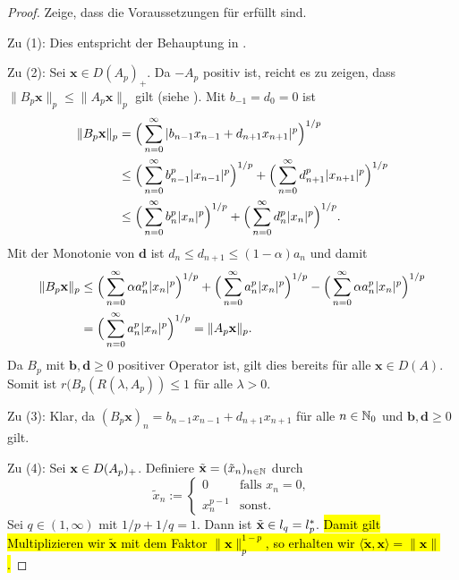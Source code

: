 \begin{proof}
\par
Zeige, dass die Voraussetzungen für  erfüllt sind.

\par
Zu (1): Dies entspricht der Behauptung in .

\par
Zu (2): Sei $\textbf{x}\in D(A_p)_+$. Da $-A_p$ positiv ist, reicht es zu zeigen, dass  $\|B_p\textbf{x}\|_p\leq\|A_p\textbf{x}\|_p$ gilt (siehe  ). Mit $b_{-1}=d_0=0$ ist
\begin{align*}
\|B_p\textnormal{\textbf{x}}\|_p
&= \Big(\sum_{n=0}^\infty |b_{n-1}x_{n-1} + d_{n+1}x_{n+1}|^p\Big)^{1/p}\\
&\leq \Big(\sum_{n=0}^\infty b_{n-1}^p |x_{n-1}|^p\Big)^{1/p} + \Big(\sum_{n=0}^\infty d_{n+1}^p |x_{n+1}|^p\Big)^{1/p}\\
&\leq \Big(\sum_{n=0}^\infty b_n^p|x_n|^p\Big)^{1/p} + \Big(\sum_{n=0}^\infty d_n^p |x_n|^p\Big)^{1/p}.
\end{align*}
Mit der Monotonie von $\textbf{d}$ ist $d_{n}\leq d_{n+1}\leq (1-\alpha)a_n$ und damit
\begin{align*}
\|B_p\textnormal{\textbf{x}}\|_p
&\leq \Big(\sum_{n=0}^\infty \alpha a_n^p|x_n|^p\Big)^{1/p} + \Big(\sum_{n=0}^\infty a_n^p |x_n|^p\Big)^{1/p} - \Big(\sum_{n=0}^\infty \alpha a_n^p |x_n|^p\Big)^{1/p}\\
&= \Big(\sum_{n=0}^\infty a_n^p |x_n|^p\Big)^{1/p}= \|A_p \textnormal{\textbf{x}}\|_p.
\end{align*}
Da $B_p$ mit $\textbf{b},\textbf{d}\geq0$ positiver Operator ist, gilt dies bereits für alle $\textbf{x}\in D(A)$. Somit ist $r(B_p(R(\lambda, A_p))\leq 1$ für alle $\lambda>0$.

\par
Zu (3): Klar, da $(B_p\textbf{x})_n=b_{n-1}x_{n-1}+d_{n+1}x_{n+1}$ für alle $n\in\mathbb{N}_0$ und $\textbf{b},\textbf{d}\geq0$ gilt.

\par
Zu (4): Sei $\textnormal{\textbf{x}}\in D(A_p)_+$. Definiere $\tilde{\textnormal{\textbf{x}}} = (\tilde x_n)_{n\in\mathbb{N}}$ durch
\begin{equation*}
\tilde x_n := 
\begin{cases}
0\quad&\text{falls }x_n=0,\\
x_n^{p-1}&\text{sonst.}
\end{cases}
\end{equation*}
Sei $q\in(1,\infty)$ mit $1/p + 1/q=1$. Dann ist $\tilde{\textnormal{\textbf{x}}}\in l_q=l_p^*$. \hl{Damit gilt  Multiplizieren wir $\tilde{\textbf{x}}$ mit dem Faktor $\|\textbf{x}\|_p^{1-p}$, so erhalten wir  $\langle \tilde{\textbf{x}},\textbf{x}\rangle = \|\textbf{x}\|$. }


\end{proof}
